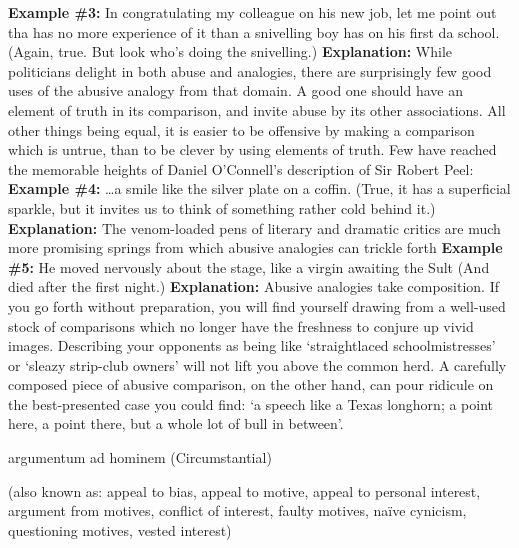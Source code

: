 \documentclass[a4paper,12pt,single,pdftex]{scrbook}
\begin{document}
 \newline
{\bf Example \#3:} \newline
In congratulating my colleague on his new job, let me point out tha has no more experience of it than a snivelling boy has on his first da school. \newline
 \newline
(Again, true. But look who’s doing the snivelling.) \newline
 \newline
{\bf Explanation:} While politicians delight in both abuse and analogies, there are surprisingly few good uses of the abusive analogy from that domain. A good one should have an element of truth in its comparison, and invite abuse by its other associations. All other things being equal, it is easier to be offensive by making a comparison which is untrue, than to be clever by using elements of truth. Few have reached the memorable heights of Daniel O’Connell’s description of Sir Robert Peel: \newline
 \newline
{\bf Example \#4:} \newline
…a smile like the silver plate on a coffin. \newline
 \newline
(True, it has a superficial sparkle, but it invites us to think of something rather cold behind it.) \newline
 \newline
{\bf Explanation:}  The venom-loaded pens of literary and dramatic critics are much more promising springs from which abusive analogies can trickle forth {\bf Example \#5:} He moved nervously about the stage, like a virgin awaiting the Sult (And died after the first night.) {\bf Explanation:} Abusive analogies take composition. If you go forth without preparation, you will find yourself drawing from a well-used stock of comparisons which no longer have the freshness to conjure up vivid images. Describing your opponents as being like ‘straightlaced schoolmistresses’ or ‘sleazy strip-club owners’ will not lift you above the common herd. A carefully composed piece of abusive comparison, on the other hand, can pour ridicule on the best-presented case you could find: ‘a speech like a Texas longhorn; a point here, a point there, but a whole lot of bull in between’.
  

argumentum ad hominem (Circumstantial)
    
      (also known as: appeal to bias, appeal to motive, appeal to personal interest, argument from motives, conflict of interest, faulty motives, naïve cynicism, questioning motives, vested interest)
    \\
\end{document}
